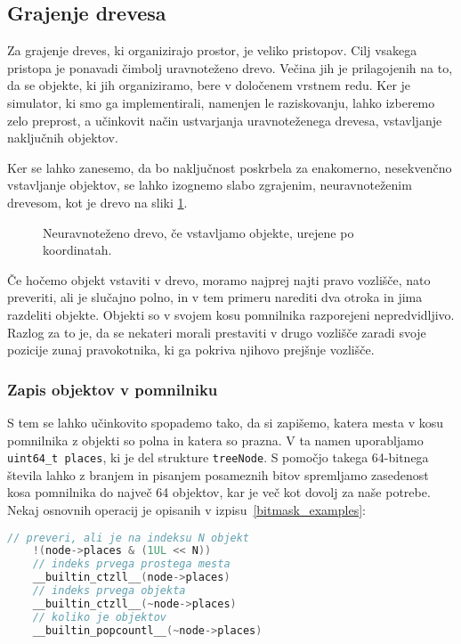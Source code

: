 \documentclass[a4paper,12pt]{article}
\begin{document}
\subsection{Grajenje drevesa}
Za grajenje dreves, ki organizirajo prostor, je veliko pristopov. Cilj vsakega pristopa je ponavadi čimbolj
uravnoteženo drevo. Večina jih je prilagojenih na to, da se objekte, ki jih organiziramo, bere v določenem
vrstnem redu. Ker je simulator, ki smo ga implementirali, namenjen le raziskovanju, lahko izberemo zelo 
preprost, a učinkovit način ustvarjanja uravnoteženega drevesa, vstavljanje naključnih objektov.

Ker se lahko zanesemo, da bo naključnost poskrbela za enakomerno, nesekvenčno vstavljanje objektov, se lahko
izognemo slabo zgrajenim, neuravnoteženim drevesom, kot je drevo na sliki \ref{fig:drevo_unbal}.
\begin{figure}
    \centering
    
    \caption{Neuravnoteženo drevo, če vstavljamo objekte, urejene po koordinatah.}
    \label{fig:drevo_unbal}
\end{figure}



Če hočemo objekt vstaviti v drevo, moramo najprej najti pravo vozlišče, nato preveriti,
ali je slučajno polno, in v tem primeru narediti dva otroka in jima razdeliti objekte.
Objekti so v svojem kosu pomnilnika razporejeni nepredvidljivo. Razlog za to je, da se nekateri
morali prestaviti v drugo vozlišče zaradi svoje pozicije zunaj pravokotnika, ki ga pokriva
njihovo prejšnje vozlišče.
\subsubsection{Zapis objektov v pomnilniku}
S tem se lahko učinkovito spopademo tako, da si zapišemo, katera mesta
v kosu pomnilnika z objekti so polna in katera so prazna. V ta namen uporabljamo \lstinline|uint64_t places|,
ki je del strukture \lstinline|treeNode|. S pomočjo takega 64-bitnega števila lahko z branjem in pisanjem
posameznih bitov spremljamo zasedenost kosa pomnilnika do največ 64 objektov, kar je več kot dovolj
za naše potrebe. Nekaj osnovnih operacij je opisanih v izpisu~\ref{bitmask_examples}:
\begin{lstlisting}[caption={Uporaba bitne maske za objekte}, label=bitmask_examples, language=C]
    // preveri, ali je na indeksu N objekt
    !(node->places & (1UL << N))
    // indeks prvega prostega mesta
    __builtin_ctzll__(node->places)
    // indeks prvega objekta
    __builtin_ctzll__(~node->places)
    // koliko je objektov
    __builtin_popcountl__(~node->places)
\end{lstlisting}

\newpage
\lstlistoflistings{}


\end{document}
